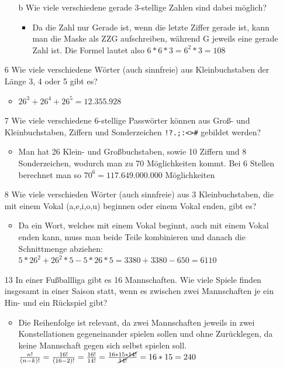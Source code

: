 \documentclass{article}
\begin{document}
\begin{itemize}
\begin{itemize}
\begin{itemize}
			\end{itemize}
			\item[b]{Wie viele verschiedene gerade 3-stellige Zahlen sind dabei möglich?}
			\begin{itemize}
				\item{Da die Zahl nur Gerade ist, wenn die letzte Ziffer gerade ist, kann man die Maske als ZZG aufschreiben, während G jeweils eine gerade Zahl ist. Die Formel lautet also $6*6*3=6^2*3=108$}
			\end{itemize}
		\end{itemize}
		\item[6]{Wie viele verschiedene Wörter (auch sinnfreie) aus Kleinbuchstaben der Länge 3, 4 oder 5 gibt es?}
		\begin{itemize}
			\item{$26^3+26^4+26^5=12.355.928$}
		\end{itemize}
		\item[7]{Wie viele verschiedene 6-stellige Passwörter können aus Groß- und Kleinbuchstaben, Ziffern und Sonderzeichen \verb|!?.;:<>#| gebildet werden?}
		\begin{itemize}
			\item{Man hat 26 Klein- und Großbuchstaben, sowie 10 Ziffern und 8 Sonderzeichen, wodurch man zu 70 Möglichkeiten kommt. Bei 6 Stellen berechnet man so $70^6=117.649.000.000$ Möglichkeiten}
		\end{itemize}
		\item[8]{Wie viele verschieden Wörter (auch sinnfreie) aus 3 Kleinbuchstaben, die mit einem Vokal (a,e,i,o,u) beginnen oder einem Vokal enden, gibt es?}
		\begin{itemize}
			\item{Da ein Wort, welches mit einem Vokal beginnt, auch mit einem Vokal enden kann, muss man beide Teile kombinieren und danach die Schnittmenge abziehen: $5*26^2+26^2*5-5*26*5=3380+3380-650=6110$}
		\end{itemize}
		\item[13]{In einer Fußballliga gibt es 16 Mannschaften. Wie viele Spiele finden insgesamt in einer Saison statt, wenn es zwischen zwei Mannschaften je ein Hin- und ein Rückspiel gibt?}
		\begin{itemize}
			\item{Die Reihenfolge ist relevant, da zwei Mannschaften jeweils in zwei Konstellationen gegeneinander spielen sollen und ohne Zurücklegen, da keine Mannschaft gegen sich selbst spielen soll. $\frac{n!}{(n-k)!}=\frac{16!}{(16-2)!}=\frac{16!}{14!}=\frac{16*15*\cancel{14!}}{\cancel{14!}}=16*15=240$}

\end{itemize}
\end{itemize}
\end{document}
